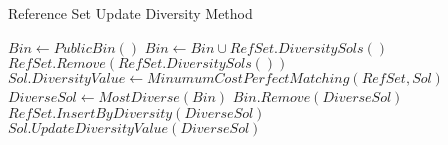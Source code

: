 \begin{algorithm}
  \caption{Reference Set Update Diversity Method}
  \label{alg:rs_updatediv}
  \begin{algorithmic}[0]
    \State $Bin \gets PublicBin()$
    \State $Bin \gets Bin \cup RefSet.DiversitySols()$
    \State $RefSet.Remove(RefSet.DiversitySols())$
    \State $Sol.DiversityValue \gets MinumumCostPerfectMatching(RefSet,Sol)$
    \EndFor
    \Repeat
    \State $DiverseSol \gets MostDiverse(Bin)$
    \State $Bin.Remove(DiverseSol)$
    \State $RefSet.InsertByDiversity(DiverseSol)$
    \State $Sol.UpdateDiversityValue(DiverseSol)$
    \EndFor
    \EndProcedure
  \end{algorithmic}
\end{algorithm}
